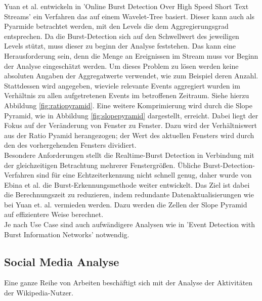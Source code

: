 Yuan et al. entwickeln in 'Online Burst Detection Over High Speed Short Text Streams' \cite{yuan2007online} ein Verfahren das auf einem Wavelet-Tree basiert. Dieser kann auch als Pyarmide betrachtet werden, mit den Levels die dem Aggregierungsgrad entsprechen. Da die Burst-Detection sich auf den Schwellwert des jeweiligen Levels stützt, muss dieser zu beginn der Analyse feststehen. Das kann eine Herausforderung sein, denn  die Menge an Ereignissen im Stream muss vor Beginn der Analyse eingeschätzt werden. Um dieses Problem zu lösen werden keine absoluten Angaben der Aggregatwerte verwendet, wie zum Beispiel deren Anzahl. Stattdessen wird angegeben, wieviele relevante Events aggregiert wurden im Verhältnis zu allen aufgetretenen Events im betroffenen Zeitraum. Siehe hierzu Abbildung \ref{fig:ratiopyramid}. Eine weitere Komprimierung wird durch die Slope Pyramid, wie in Abbildung \ref{fig:slopepyramid} dargestellt, erreicht. Dabei liegt der Fokus auf der Veränderung von Fenster zu Fenster. Dazu wird der Verhältniswert aus der Ratio Pyamid herangezogen; der Wert des aktuellen Fensters wird durch den des vorhergehenden Fensters dividiert.\cite{yuan2007online}\\

Besondere Anforderungen stellt die Realtime-Burst Detection in Verbindung mit der gleichzeitigen Betrachtung mehrerer Fenstergrößen. Übliche Burst-Detection-Verfahren sind für eine Echtzeiterkennung nicht schnell genug, daher wurde von Ebina et al. \cite{ebina2011real} die Burst-Erkennungsmethode weiter entwickelt. Das Ziel ist dabei die Berechnungszeit zu reduzieren, indem redundante Datenaktualisierungen wie bei Yuan et. al. vermieden werden. Dazu werden die Zellen der Slope Pyramid auf effizientere Weise berechnet.\cite{ebina2011real}\\

Je nach Use Case sind auch aufwändigere Analysen wie in 'Event Detection with Burst Information Networks' \cite{ge2016event} notwendig.


\subsection{Social Media Analyse}
Eine ganze Reihe von Arbeiten beschäftigt sich mit der Analyse der Aktivitäten der Wikipedia-Nutzer.

